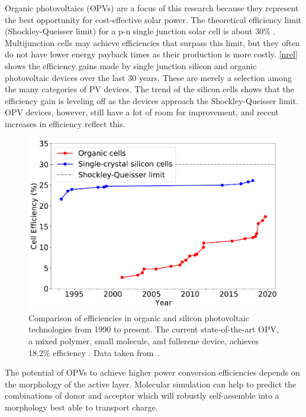 Organic photovoltaics (OPVs) are a focus of this research because they represent the best opportunity for cost-effective solar power.
The theoretical efficiency limit (Shockley-Queisser limit) for a p-n single junction solar cell is about 30\% \citep{Shockley1961}.
Multijunction cells may achieve efficiencies that surpass this limit, but they often do not have lower energy payback times as their production is more costly.
\autoref{nrel} shows the efficiency gains made by single junction silicon and organic photovoltaic devices over the last 30 years.
These are merely a selection among the many categories of PV devices.
The trend of the silicon cells shows that the efficiency gain is leveling off as the devices approach the Shockley-Queisser limit.
OPV devices, however, still have a lot of room for improvement, and recent increases in efficiency reflect this.
\begin{figure}[h!]
    \centering
    \includegraphics[width=0.8\linewidth]{figures/p3ht_val/NREL2020.pdf}
    \caption[Comparison of efficiencies in organic and silicon photovoltaic technologies from 1990 to present. The current state-of-the-art OPV, a mixed polymer, small molecule, and fullerene device, achieves 18.2\% efficiency. Data taken from National Renewable Energy Laboratory U.S. Department of Energy.]{Comparison of efficiencies in organic and silicon photovoltaic technologies from 1990 to present. The current state-of-the-art OPV, a mixed polymer, small molecule, and fullerene device, achieves 18.2\% efficiency \cite{Zhang2021}. Data taken from~\citet{NREL2020}.}\label{nrel}
\end{figure}
The potential of OPVs to achieve higher power conversion efficiencies depends on the morphology of the active layer. 
Molecular simulation can help to predict the combinations of donor and acceptor which will robustly self-assemble into a morphology best able to transport charge. 

